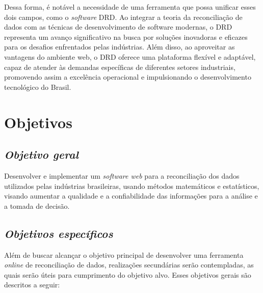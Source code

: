 
Dessa forma, é notável a necessidade de uma ferramenta que possa unificar esses dois campos, como o \textit{software} DRD. Ao integrar a teoria da reconciliação de dados com as técnicas de desenvolvimento de software modernas, o DRD representa um avanço significativo na busca por soluções inovadoras e eficazes para os desafios enfrentados pelas indústrias. Além disso, ao aproveitar as vantagens do ambiente web, o DRD oferece uma plataforma flexível e adaptável, capaz de atender às demandas específicas de diferentes setores industriais, promovendo assim a excelência operacional e impulsionando o desenvolvimento tecnológico do Brasil.

\section{Objetivos}

\subsection{\textit{Objetivo geral}}

Desenvolver e implementar um \textit{software web} para a reconciliação dos dados utilizados pelas indústrias brasileiras, usando métodos matemáticos e estatísticos, visando aumentar a qualidade e a confiabilidade das informações para a análise e a tomada de decisão.

\subsection{\textit{Objetivos específicos}}

Além de buscar alcançar o objetivo principal de desenvolver uma ferramenta \textit{online} de reconciliação de dados, realizações secundárias serão contempladas, as quais serão úteis para cumprimento do objetivo alvo. Esses objetivos gerais são descritos a seguir: 

